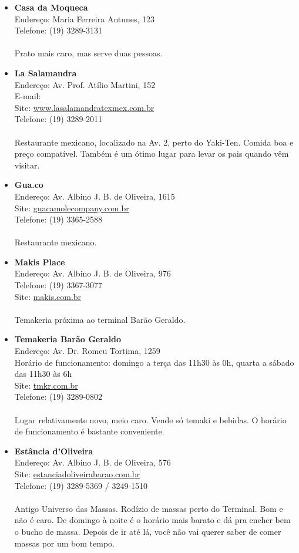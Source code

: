 \begin{itemize}
\item \textbf{Casa da Moqueca}
  \\Endereço: Maria Ferreira Antunes, 123
  \\Telefone: (19) 3289-3131
  \\
  \\Prato mais caro, mas serve duas pessoas.
\item \textbf{La Salamandra}
  \\Endereço: Av. Prof. Atílio Martini, 152
  \\E-mail: 
  \\Site: \url{www.lasalamandratexmex.com.br}
  \\Telefone: (19) 3289-2011
  \\
  \\Restaurante mexicano, localizado na Av. 2, perto do Yaki-Ten. Comida boa e
  preço compatível. Também é um ótimo lugar para levar os pais quando vêm
  visitar.
\item \textbf{Gua.co}
  \\Endereço: Av. Albino J. B. de Oliveira, 1615
  \\Site: \url{guacamolecompany.com.br}
  \\Telefone: (19) 3365-2588
  \\
  \\Restaurante mexicano.
\item \textbf{Makis Place}
  \\Endereço: Av. Albino J. B. de Oliveira, 976
  \\Telefone: (19) 3367-3077
  \\Site: \url{makis.com.br}
  \\
  \\Temakeria próxima ao terminal Barão Geraldo.
\item \textbf{Temakeria Barão Geraldo}
  \\Endereço: Av. Dr. Romeu Tortima, 1259
  \\Horário de funcionamento: domingo a terça das 11h30 às 0h, quarta a
  sábado das 11h30 às 6h
  \\Site: \url{tmkr.com.br}
  \\Telefone: (19) 3289-0802
  \\
  \\Lugar relativamente novo, meio caro. Vende só temaki e bebidas. O horário
  de funcionamento é bastante conveniente.
\item \textbf{Estância d'Oliveira}
  \\Endereço: Av. Albino J. B. de Oliveira, 576
  \\Site: \url{estanciadoliveirabarao.com.br}
  \\Telefone: (19) 3289-5369 / 3249-1510
  \\
  \\Antigo Universo das Massas. Rodízio de massas perto do Terminal. Bom e não
  é caro. De domingo à noite é o horário mais barato e dá pra encher bem o
  bucho de massa. Depois de ir até lá, você não vai querer saber de comer
  massas por um bom tempo.
\end{itemize}

